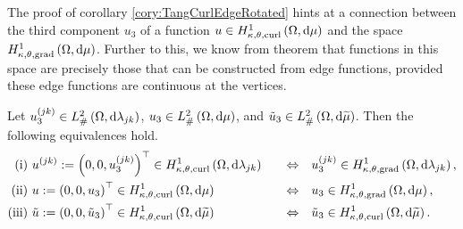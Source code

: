 The proof of corollary \ref{cory:TangCurlEdgeRotated} hints at a connection between the third component $u_3$ of a function $u\in H^1_{\kappa,\theta,\mathrm{curl}}\left( \Omega, \mathrm{d}\mu \right)$ and the space $H^1_{\kappa,\theta,\mathrm{grad}}\left( \Omega, \mathrm{d}\mu \right)$.
Further to this, we know from theorem  that functions in this space are precisely those that can be constructed from edge functions, provided these edge functions are continuous at the vertices.
\begin{prop} \label{prop:TC-3rdComponentIFF}
	Let $u_3^{(jk)}\in L^2_{\#}\left( \Omega,\mathrm{d} \lambda_{jk} \right)$, $u_3\in L^2_{\#}\left( \Omega,\mathrm{d} \mu \right)$, and $\tilde{u}_3\in L^2_{\#}\left( \Omega,\mathrm{d} \widetilde{\mu} \right)$.
	Then the following equivalences hold.
	\begin{align*}
		\mathrm{(i)} \ &
		u^{(jk)}:= \left( 0,0,u_3^{(jk)} \right)^\top\in H^1_{\kappa,\theta,\mathrm{curl}}\left( \Omega, \mathrm{d}\lambda_{jk} \right)
		\quad &\Leftrightarrow &\quad
		u_3^{(jk)}\in H^1_{\kappa,\theta,\mathrm{grad}}\left( \Omega, \mathrm{d}\lambda_{jk} \right), \\
		\mathrm{(ii)} \ &
		u:= \left( 0,0,u_3 \right)^\top\in H^1_{\kappa,\theta,\mathrm{curl}}\left( \Omega, \mathrm{d}\mu \right)
		\quad &\Leftrightarrow &\quad
		u_3\in H^1_{\kappa,\theta,\mathrm{grad}}\left( \Omega, \mathrm{d}\mu \right), \\
		\mathrm{(iii)} \ &
		\tilde{u} := \left( 0,0,\tilde{u}_3 \right)^\top\in H^1_{\kappa,\theta,\mathrm{curl}}\left( \Omega, \mathrm{d}\widetilde{\mu} \right)
		\quad &\Leftrightarrow &\quad
		\tilde{u}_3\in H^1_{\kappa,\theta,\mathrm{curl}}\left( \Omega, \mathrm{d}\widetilde{\mu} \right).
	\end{align*}
\end{prop}
